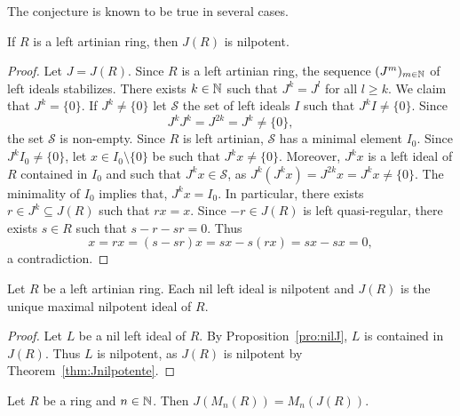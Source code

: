 The conjecture is known to be true in several cases.

\begin{theorem}
	\label{thm:Jnilpotente}
	If $R$ is a left artinian ring, then $J(R)$ is nilpotent. 
\end{theorem}

\begin{proof}
	Let $J=J(R)$. Since $R$ is a left artinian ring, the sequence 
	$(J^m)_{m\in\mathbb{N}}$ of left ideals stabilizes. There exists 
	$k\in\mathbb{N}$ such that $J^k=J^l$ for all $l\geq k$. We claim that $J^k=\{0\}$. If
	$J^k\ne\{0\}$ let $\mathcal{S}$ the set of left ideals 
	$I$ such that $J^kI\ne\{0\}$. Since 
	\[
	J^kJ^k=J^{2k}=J^k\ne\{0\},
	\]
	the set $\mathcal{S}$ is non-empty. 
	Since $R$ is left artinian, $\mathcal{S}$ has a minimal element $I_0$. Since $J^kI_0\ne\{0\}$, let $x\in
	I_0\setminus\{0\}$ be such that $J^kx\ne\{0\}$. Moreover, $J^kx$ is a left ideal of $R$ 
	contained in $I_0$ and such that $J^kx\in\mathcal{S}$, as 
	$J^k(J^kx)=J^{2k}x=J^kx\ne\{0\}$. The minimality of $I_0$ implies that, $J^kx=I_0$. In particular, 
	there exists $r\in J^k\subseteq J(R)$ such that $rx=x$. Since $-r\in
	J(R)$ is left quasi-regular, there exists $s\in R$ such that $s-r-sr=0$.
	Thus 
	\[
		x=rx=(s-sr)x=sx-s(rx)=sx-sx=0,
	\]
	a contradiction.
\end{proof}

\begin{corollary}
	Let $R$ be a left artinian ring. Each nil left ideal is nilpotent and 
	$J(R)$ is the unique maximal nilpotent ideal of $R$. 
\end{corollary}

\begin{proof}
	Let $L$ be a nil left ideal of $R$. By Proposition~\ref{pro:nilJ}, $L$
	is contained in $J(R)$. Thus $L$ is nilpotent, as $J(R)$ 
	is nilpotent by Theorem~\ref{thm:Jnilpotente}. 
\end{proof}

\begin{theorem}
	Let $R$ be a ring and $n\in\mathbb{N}$. Then $J(M_n(R))=M_n(J(R))$. 
\end{theorem}

